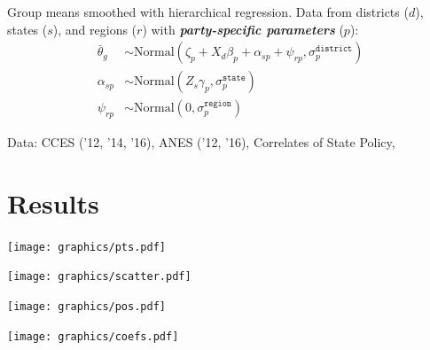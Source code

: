 \documentclass[a0]{a0poster}
\begin{document}
\begin{multicols*}{3}
Group means smoothed with hierarchical regression. Data from districts ($d$), states ($s$), and regions ($r$) with \emph{\textbf{party-specific parameters}} ($p$):
\begin{align}
  \bar{\theta}_{g} &\sim \mathrm{Normal}\left(\zeta_{p} + X_{d}\beta_{p} + \alpha_{sp} + \psi_{rp}, \sigma^{\texttt{district}}_{p} \right) \\[12pt]
  \alpha_{sp} &\sim \mathrm{Normal}\left( Z_{s}\gamma_{p}, \sigma_{p}^{\texttt{state}} \right) \\[12pt]
  \psi_{rp} &\sim \mathrm{Normal}\left(0, \sigma_{p}^{\texttt{region}}\right)
\end{align}



Data: CCES ('12, '14, '16), ANES ('12, '16), Correlates of State Policy, \textcite{foster-molina:2016:data}





\section*{Results}

\begin{center}
  \texttt{[image: graphics/pts.pdf]}
\end{center}

\vspace{1em}

\begin{center}
  \texttt{[image: graphics/scatter.pdf]}
\end{center}


\vspace{1em}

\begin{center}
  \texttt{[image: graphics/pos.pdf]}
\end{center}

\begin{center}
  \texttt{[image: graphics/coefs.pdf]}
\end{center}



%
\vfill
\footnotesize
\printbibliography
% 
% 

\end{multicols*}
\end{document}
